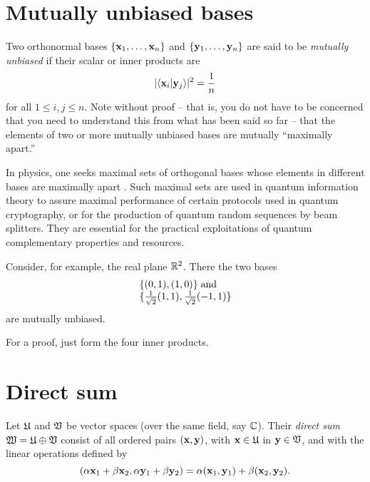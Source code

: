 \section{Mutually unbiased bases}

Two  orthonormal bases
$\{
{\bf x}_1,
\ldots ,
{\bf x}_n
\}$
and
$\{
{\bf y}_1,
\ldots ,
{\bf y}_n
\}$
are said to be {\em mutually unbiased}
if
their scalar or inner products are
\begin{equation}
\vert \langle {\bf x}_i\vert {\bf y}_j  \rangle \vert^2
=
\frac{1}{n}
\end{equation}
for all $1\le i,j\le n$.
Note without proof -- that is, you do not have to be concerned
that you need to understand  this from what has been said so far --
that the elements of two or more mutually unbiased bases are mutually ``maximally apart.''

{\color{Purple}
In physics, one seeks maximal sets of orthogonal bases whose elements in different bases
are maximally apart \cite{WooFie,durt} .
Such maximal sets are used in quantum information theory
to assure maximal performance of certain protocols
used in quantum cryptography, or for the production of
quantum random sequences by beam splitters.
They are essential for the practical exploitations of quantum complementary properties
and resources.
}

{\color{blue}
\bexample
Consider, for example, the real plane ${\Bbb R}^2$.
There the two bases
\begin{equation}
\begin{array}{l}
\{(0,1),(1,0)\} \; {\rm and }\\
\{\frac{1}{\sqrt{2}}(1,1),\frac{1}{\sqrt{2}}(-1,1)\}
\end{array}
\end{equation}
are mutually unbiased.
\eexample
}

{\color{OliveGreen}
\bproof
For a proof, just form the four inner products.
\eproof
}




\section{Direct sum}

Let
${\frak U}$
and
${\frak V}$
be vector spaces (over the same field, say ${\Bbb C}$).
Their {\em direct sum}
${\frak W}={\frak U}\oplus{\frak V}$
consist of all ordered pairs
$({\bf x},{\bf y})$, with
${\bf x}\in {\frak U}$ in
${\bf y}\in {\frak V}$,
and with the linear operations defined by
\begin{equation}
(
\alpha {\bf x}_1 +\beta {\bf x}_2
,
\alpha {\bf y}_1 +\beta {\bf y}_2
)
=
\alpha  ({\bf x}_1,{\bf y}_1)
+
\beta   ({\bf x}_2,{\bf y}_2).
\end{equation}

